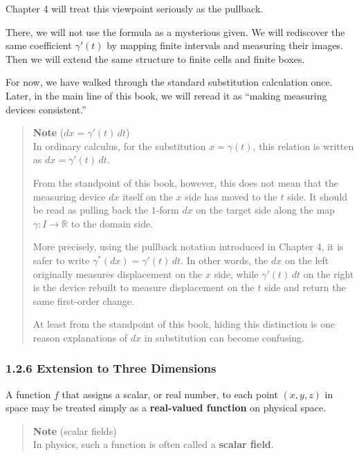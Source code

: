 \documentclass[a4paper,12pt,openany]{book}
\begin{document}
Chapter 4 will treat this viewpoint seriously as the pullback.

There, we will not use the formula as a mysterious given. We will
rediscover the same coefficient \(\gamma'(t)\) by mapping finite
intervals and measuring their images. Then we will extend the same
structure to finite cells and finite boxes.

For now, we have walked through the standard substitution calculation
once. Later, in the main line of this book, we will reread it as
``making measuring devices consistent.''

\begin{quote}
\textbf{Note} (\(dx=\gamma'(t)\,dt\))\\
In ordinary calculus, for the substitution \(x=\gamma(t)\), this
relation is written as \(dx=\gamma'(t)\,dt\).

From the standpoint of this book, however, this does not mean that the
measuring device \(dx\) itself on the \(x\) side has moved to the \(t\)
side. It should be read as pulling back the \(1\)-form \(dx\) on the
target side along the map \(\gamma:I\to\mathbb{R}\) to the domain side.

More precisely, using the pullback notation introduced in Chapter 4, it
is safer to write \(\gamma^\ast(dx)=\gamma'(t)\,dt\). In other words,
the \(dx\) on the left originally measures displacement on the \(x\)
side, while \(\gamma'(t)\,dt\) on the right is the device rebuilt to
measure displacement on the \(t\) side and return the same first-order
change.

At least from the standpoint of this book, hiding this distinction is
one reason explanations of \(dx\) in substitution can become confusing.
\end{quote}

\hypertarget{extension-to-three-dimensions}{%
\subsubsection{1.2.6 Extension to Three
Dimensions}\label{extension-to-three-dimensions}}

A function \(f\) that assigns a scalar, or real number, to each point
\((x,y,z)\) in space may be treated simply as a
\textbf{real-valued function} on physical space.

\begin{quote}
\textbf{Note} (scalar fields)\\
In physics, such a function is often called a \textbf{scalar field}.
\end{quote}
\end{document}
